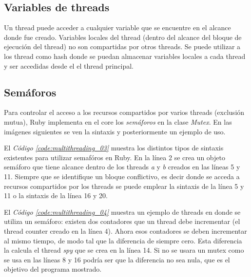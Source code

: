 \documentclass{article}
\newcommand{\refcode}[1]{\textit{Código \ref{#1}}}
\begin{document}
\subsection{Variables de threads}
	
	Un thread puede acceder a cualquier variable que se encuentre en el alcance donde fue creado. Variables locales del thread (dentro del alcance del bloque de ejecución del thread) no son compartidas por otros threads. Se puede utilizar a los thread como hash donde se puedan almacenar variables locales a cada thread y ser accedidas desde el el thread principal.

 
\bigskip



\subsection{Semáforos}

	Para controlar el acceso a los recursos compartidos por varios threads (exclusión mutua), Ruby implementa en el core los \textit{semáforos} en la clase \textit{Mutex}. En las imágenes siguientes se ven la sintaxis y posteriormente un ejemplo de uso.
	\par
	El \refcode{code:multithreading_03} muestra los distintos tipos de sintaxis existentes para utilizar semafóros en Ruby. En la línea 2 se crea un objeto semáforo que tiene alcance dentro de los threads \textit{a} y \textit{b} creados en las líneas 5 y 11. Siempre que se identifique un bloque conflictivo, es decir donde se acceda a recursos compartidos por los threads se puede emplear la sintaxis de la línea 5 y 11 o la sintaxis de la línea  16 y 20.

 
\bigskip\bigskip

	El \refcode{code:multithreading_04} muestra un ejemplo de threads en donde se utiliza un semáforo: existen dos contadores que un thread debe incrementar (el thread counter creado en la línea 4). Ahora esos contadores se deben incrementar al mismo tiempo, de modo tal que la diferencia de siempre cero. Esta diferencia la calcula el thread \textit{spy} que se crea en la línea 14. Si no se usara un mutex como se usa en las líneas 8 y 16 podría ser que la diferencia no sea nula, que es el objetivo del programa mostrado.
\bigskip
\end{document}
